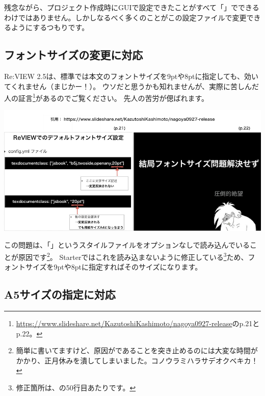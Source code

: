 残念ながら、プロジェクト作成時にGUIで設定できたことがすべて「」でできるわけではありません。しかしなるべく多くのことがこの設定ファイルで変更できるようにするつもりです。

\subsection*{フォントサイズの変更に対応}
\label{sec:1-2-2}

Re:VIEW 2.5は、標準では本文のフォントサイズを9ptや8ptに指定しても、効いてくれません（まじかー！）。
ウソだと思うかも知れませんが、実際に苦しんだ人の証言\footnote{\url{https://www.slideshare.net/KazutoshiKashimoto/nagoya0927-release}のp.21とp.22。}があるのでご覧ください。
先人の苦労が偲ばれます。

\begin{reviewimage}%
\includegraphics[width=\maxwidth]{./images/chap01-starter/slide2.png}%
\label{image:chap01-starter:slide2}
\end{reviewimage}

この問題は、「」というスタイルファイルをオプションなしで読み込んでいることが原因です\footnote{簡単に書いてますけど、原因がであることを突き止めるのには大変な時間がかかり、正月休みを潰してしまいました。コノウラミハラサデオクベキカ！}。
Starterではこれを読み込まないように修正している\footnote{修正箇所は、の50行目あたりです。}ため、フォントサイズを9ptや8ptに指定すればそのサイズになります。

\subsection*{A5サイズの指定に対応}
\label{sec:1-2-3}

